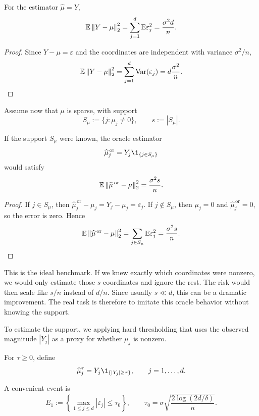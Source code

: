 \begin{cor}
For the estimator $\widehat\mu=Y$,
\[
\mathbb{E} \left\lVert Y-\mu\right\rVert_2^2
=
\sum_{j=1}^d \mathbb{E} \varepsilon_j^2
=
\frac{\sigma^2 d}{n}.
\]
\end{cor}

\begin{proof}
Since $Y-\mu=\varepsilon$ and the coordinates are independent with variance $\sigma^2/n$,
\[
\mathbb{E} \left\lVert Y-\mu\right\rVert_2^2
=
\sum_{j=1}^d \operatorname{Var}(\varepsilon_j)
=
d\frac{\sigma^2}{n}.
\]
\end{proof}


Assume now that $\mu$ is sparse, with support
\[
S_\mu:=\{j:\mu_j\neq 0\},
\qquad s:=|S_\mu|.
\]

\begin{prop}
If the support $S_\mu$ were known, the oracle estimator
\[
\widehat\mu^{\,\mathrm{or}}_j
=
Y_j \1_{\{j\in S_\mu\}}
\]
would satisfy
\[
\mathbb{E} \left\lVert\widehat\mu^{\,\mathrm{or}}-\mu\right\rVert_2^2
=
\frac{\sigma^2 s}{n}.
\]
\end{prop}

\begin{proof}
If $j\in S_\mu$, then $\widehat\mu^{\,\mathrm{or}}_j-\mu_j=Y_j-\mu_j=\varepsilon_j$.
If $j\notin S_\mu$, then $\mu_j=0$ and $\widehat\mu^{\,\mathrm{or}}_j=0$, so the error is zero.
Hence
\[
\mathbb{E} \left\lVert\widehat\mu^{\,\mathrm{or}}-\mu\right\rVert_2^2
=
\sum_{j\in S_\mu}\mathbb{E} \varepsilon_j^2
=
\frac{\sigma^2 s}{n}.
\]
\end{proof}

\begin{remark}
This is the ideal benchmark.
If we knew exactly which coordinates were nonzero, we would only estimate those $s$ coordinates and ignore the rest.
The risk would then scale like $s/n$ instead of $d/n$.
Since usually $s\ll d$, this can be a dramatic improvement.
The real task is therefore to imitate this oracle behavior without knowing the support.
\end{remark}
To estimate the support, we applying hard thresholding that uses the observed magnitude $|Y_j|$ as a proxy for whether $\mu_j$ is nonzero.

\begin{de}
For $\tau\ge 0$, define
\[
\widehat\mu^\tau_j
=
Y_j \1_{\{|Y_j|\ge \tau\}},
\qquad j=1,\dots,d.
\]
\end{de}


A convenient event is
\[
E_1
:=
\left\{
\max_{1\le j\le d} |\varepsilon_j|
\le \tau_0
\right\},
\qquad
\tau_0
=
\sigma \sqrt{\frac{2\log(2d/\delta)}{n}}.
\]

